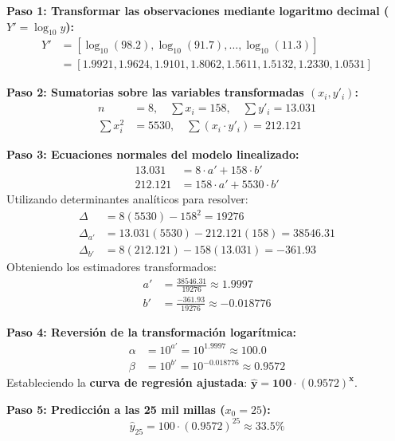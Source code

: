 \documentclass[11pt,letterpaper]{article}
\begin{document}
\textbf{Paso 1: Transformar las observaciones mediante logaritmo decimal ($Y' = \log_{10} y$):}
\begin{align*}
    Y' &= [\log_{10}(98.2), \log_{10}(91.7), \dots, \log_{10}(11.3)] \\
    &= [1.9921, 1.9624, 1.9101, 1.8062, 1.5611, 1.5132, 1.2330, 1.0531]
\end{align*}

\textbf{Paso 2: Sumatorias sobre las variables transformadas $(x_i, y'_i)$:}
\begin{align*}
    n &= 8, \quad \sum x_i = 158, \quad \sum y'_i = 13.031 \\
    \sum x_i^2 &= 5530, \quad \sum (x_i \cdot y'_i) = 212.121
\end{align*}

\textbf{Paso 3: Ecuaciones normales del modelo linealizado:}
\begin{align}
    13.031 &= 8 \cdot a' + 158 \cdot b' \\
    212.121 &= 158 \cdot a' + 5530 \cdot b'
\end{align}
Utilizando determinantes analíticos para resolver:
\begin{align}
    \Delta &= 8(5530) - 158^2 = 19276 \\
    \Delta_{a'} &= 13.031(5530) - 212.121(158) = 38546.31 \\
    \Delta_{b'} &= 8(212.121) - 158(13.031) = -361.93
\end{align}
Obteniendo los estimadores transformados:
\begin{align}
    a' &= \frac{38546.31}{19276} \approx 1.9997 \\
    b' &= \frac{-361.93}{19276} \approx -0.018776
\end{align}

\textbf{Paso 4: Reversión de la transformación logarítmica:}
\begin{align}
    \alpha &= 10^{a'} = 10^{1.9997} \approx \mathbf{100.0} \\
    \beta &= 10^{b'} = 10^{-0.018776} \approx \mathbf{0.9572}
\end{align}
Estableciendo la \textbf{curva de regresión ajustada}: $\mathbf{\hat{y} = 100 \cdot (0.9572)^x}$.

\textbf{Paso 5: Predicción a las 25 mil millas ($x_0 = 25$):}
\begin{equation}
    \hat{y}_{25} = 100 \cdot (0.9572)^{25} \approx \mathbf{33.5\%}
\end{equation}
\end{document}
